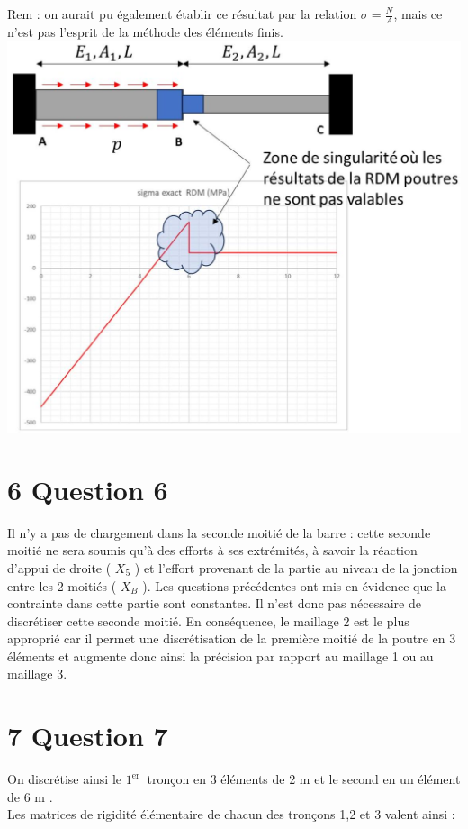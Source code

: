 \documentclass[11pt,a4paper]{report}
\begin{document}
{Rem : on aurait pu également établir ce résultat par la relation $\sigma=\frac{N}{A}$, mais ce n'est pas l'esprit de la méthode des éléments finis.\\
\includegraphics[max width=\textwidth, center]{2025_10_03_26e11264345fd9bad5cag-6}

\section*{6 Question 6}
Il n'y a pas de chargement dans la seconde moitié de la barre : cette seconde moitié ne sera soumis qu'à des efforts à ses extrémités, à savoir la réaction d'appui de droite ( $X_{5}$ ) et l'effort provenant de la partie au niveau de la jonction entre les 2 moitiés ( $X_{B}$ ). Les questions précédentes ont mis en évidence que la contrainte dans cette partie sont constantes. Il n'est donc pas nécessaire de discrétiser cette seconde moitié. En conséquence, le maillage 2 est le plus approprié car il permet une discrétisation de la première moitié de la poutre en 3 éléments et augmente donc ainsi la précision par rapport au maillage 1 ou au maillage 3.

\section*{7 Question 7}
On discrétise ainsi le $1^{\text {er }}$ tronçon en 3 éléments de 2 m et le second en un élément de 6 m .\\
Les matrices de rigidité élémentaire de chacun des tronçons 1,2 et 3 valent ainsi :

}
\end{document}
